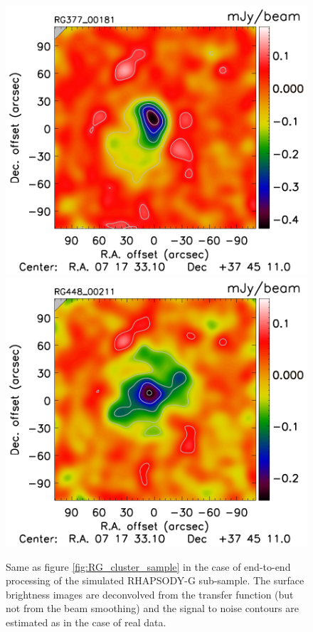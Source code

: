 \documentclass[twocolumn,traditabstract]{aa}
\begin{document}
\begin{figure}[h]
\includegraphics[trim=0cm 0.7cm 0cm 0cm, clip=true, totalheight=3.7cm]{Figure/DoG_RG377_00181_Ymap_zobs0p5_processed_15_15_45.pdf}
\includegraphics[trim=0cm 0.7cm 0cm 0cm, clip=true, totalheight=3.7cm]{Figure/DoG_RG448_00211_Ymap_zobs0p4_processed_15_15_45.pdf}
\caption{\footnotesize{Same as figure \ref{fig:RG_cluster_sample} in the case of end-to-end processing of the simulated RHAPSODY-G sub-sample. The surface brightness images are deconvolved from the transfer function (but not from the beam smoothing) and the signal to noise contours are estimated as in the case of real data.}}
\label{fig:RG_cluster_sample_proc}
\end{figure}
\end{document}
